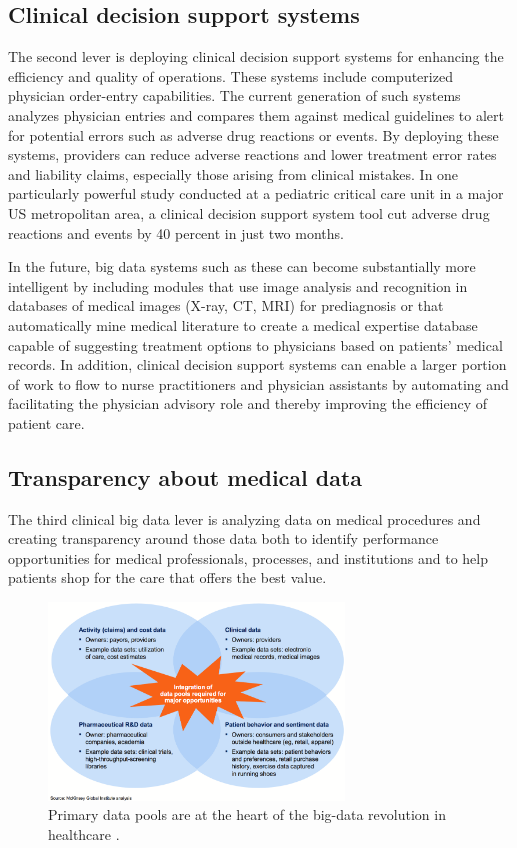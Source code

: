 \documentclass[twocolumn]{article}
\begin{document}
\subsection{Clinical decision support systems}
The second lever is deploying clinical decision support systems for enhancing the efficiency and quality of operations. These systems include computerized physician order-entry capabilities. The current generation of such systems analyzes physician entries and compares them against medical guidelines to alert for potential errors such as adverse drug reactions or events. By deploying these systems, providers can reduce adverse reactions and lower treatment error rates and liability claims, especially those arising from clinical mistakes. In one particularly powerful study conducted at a pediatric critical care unit in a major US metropolitan area, a clinical decision support system tool cut adverse drug reactions and events by 40 percent in just two months.

In the future, big data systems such as these can become substantially more intelligent by including modules that use image analysis and recognition in databases of medical images (X-ray, CT, MRI) for prediagnosis or that automatically mine medical literature to create a medical expertise database capable of suggesting treatment options to physicians based on patients’ medical records. In addition, clinical decision support systems can enable a larger portion of work to flow to nurse practitioners and physician assistants by automating and facilitating the physician advisory role and thereby improving the efficiency of patient care.

\subsection{Transparency about medical data}
The third clinical big data lever is analyzing data on medical procedures and creating transparency around those data both to identify performance opportunities for medical professionals, processes, and institutions and to help patients shop for the care that offers the best value.

\begin{figure}[htb]
        \centering
        \includegraphics[width=0.7\textwidth]{data-pools.png}
        \caption{Primary data pools are at the heart of the big-data revolution in healthcare \cite{Groves:2013}.}
        \label{fig:data-pools}
\end{figure}
\end{document}
